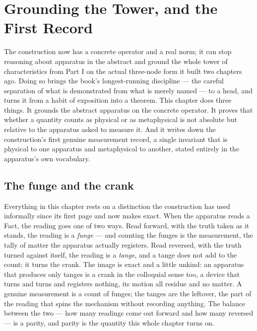\chapter{Grounding the Tower, and the First Record}
\label{chap:grounding-and-first-record}

The construction now has a concrete operator and a real norm; it can stop reasoning about apparatus in
the abstract and ground the whole tower of characteristics from Part I on the actual three-node form it
built two chapters ago. Doing so brings the book's longest-running discipline --- the careful
separation of what is demonstrated from what is merely named --- to a head, and turns it from a habit of
exposition into a theorem. This chapter does three things. It grounds the abstract apparatus on the
concrete operator. It proves that whether a quantity counts as physical or as metaphysical is not
absolute but relative to the apparatus asked to measure it. And it writes down the construction's first
genuine measurement record, a single invariant that is physical to one apparatus and metaphysical to
another, stated entirely in the apparatus's own vocabulary.

\section{The funge and the crank}
\label{se:the-funge-and-the-crank}

Everything in this chapter rests on a distinction the construction has used informally since its first
page and now makes exact. When the apparatus reads a Fact, the reading goes one of two ways. Read
forward, with the truth taken as it stands, the reading is a \emph{funge} --- and counting the funges is
the measurement, the tally of matter the apparatus actually registers. Read reversed, with the truth
turned against itself, the reading is a \emph{tange}, and a tange does not add to the count; it turns
the crank. The image is exact and a little unkind: an apparatus that produces only tanges is a crank in
the colloquial sense too, a device that turns and turns and registers nothing, its motion all residue
and no matter. A genuine measurement is a count of funges; the tanges are the leftover, the part of the
reading that spins the mechanism without recording anything. The balance between the two --- how many
readings come out forward and how many reversed --- is a parity, and parity is the quantity this whole
chapter turns on.

